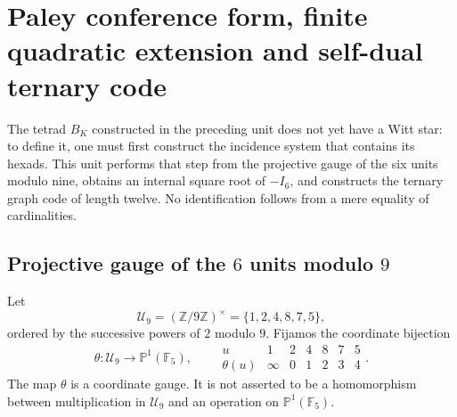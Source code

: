 \label{chap:83-20}




\section{Paley conference form, finite quadratic extension and self-dual ternary code}
\label{p12-83-c20-s1:chap:paley-extension-cuadratica-codigo-ternario}

The tetrad \(B_K\) constructed in the preceding unit does not yet have a
Witt star: to define it, one must first construct the incidence system that
contains its hexads. This unit performs that step from the
projective gauge of the six units modulo nine, obtains an internal square
root of \(-I_6\), and constructs the ternary graph code of
length twelve. No identification follows from a mere equality of
cardinalities.

\subsection{Projective gauge of the \(6\) units modulo \(9\)}

Let
\[
 \mathcal U_9=(\mathbb Z/9\mathbb Z)^\times
 =\{1,2,4,8,7,5\},
\]
ordered by the successive powers of \(2\) modulo \(9\). Fijamos the
coordinate bijection
\begin{equation}
 \theta:\mathcal U_9\longrightarrow\mathbb P^1(\mathbb F_5),
 \qquad
 \begin{array}{c|cccccc}
 u&1&2&4&8&7&5\\ \hline
 \theta(u)&\infty&0&1&2&3&4
 \end{array}.
 \label{p12-83-c20-s1:eq:calibre-unidades-paley}
\end{equation}
The map \(\theta\) is a coordinate gauge. It is not asserted to be a homomorphism between multiplication in \(\mathcal U_9\) and an operation on \(\mathbb P^1(\mathbb F_5)\).

